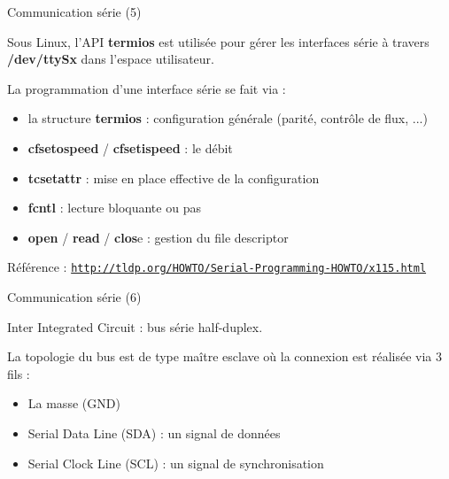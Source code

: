 \documentclass[12pt, t]{beamer}
\newcommand{\bi}{\begin{itemize}}
\newcommand{\ei}{\end{itemize}}
\newcommand{\myhref}[1]{\href{#1}{\tt \tiny #1}}
\begin{document}
\begin{frame}{Communication série (5)}

    \vspace{10pt}
    Sous Linux, l'API {\textbf{termios}} est utilisée pour gérer les interfaces
    série à travers {\textbf{/dev/ttySx}} dans l'espace utilisateur.

    {
        \vspace{10pt}
        La programmation d'une interface série se fait via :
        \bi
        \itemsep5pt
        \item la structure {\textbf{termios}} : configuration générale (parité,
              contrôle de flux, ...)
        \item {\textbf{cfsetospeed}} / {\textbf{cfsetispeed}} : le débit
        \item {\textbf{tcsetattr}} : mise en place effective de la configuration
        \item {\textbf{fcntl}} : lecture bloquante ou pas
        \item {\textbf{open}} / {\textbf{read}} / {\textbf{clos}}e : gestion du
              file descriptor
        \ei
    }

    {
        \vspace{10pt}
        Référence : \myhref{http://tldp.org/HOWTO/Serial-Programming-HOWTO/x115.html}
    }
\end{frame}

\begin{frame}{Communication série (6)}

    \vspace{15pt}
    Inter Integrated Circuit : bus série half-duplex.

    {
        \vspace{15pt}
        La topologie du bus est de type maître esclave où la connexion est réalisée
        via 3 fils :
        \bi
        \itemsep8pt
        \item La masse (GND)
        \item Serial Data Line (SDA) : un signal de données
        \item Serial Clock Line (SCL) : un signal de synchronisation
        \ei
    }
\end{frame}
\end{document}
